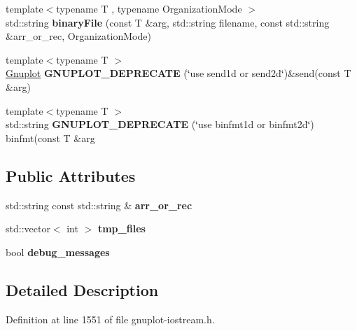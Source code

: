 \begin{DoxyCompactItemize}
\item 
{\footnotesize template$<$typename T , typename Organization\+Mode $>$ }\\std\+::string {\bfseries binary\+File} (const T \&arg, std\+::string filename, const std\+::string \&arr\+\_\+or\+\_\+rec, Organization\+Mode)\hypertarget{classgnuplotio_1_1_gnuplot_ad90501e6dbab5379abcd76fd0e2e4ef1}{}\label{classgnuplotio_1_1_gnuplot_ad90501e6dbab5379abcd76fd0e2e4ef1}

\item 
{\footnotesize template$<$typename T $>$ }\\\hyperlink{classgnuplotio_1_1_gnuplot}{Gnuplot} {\bfseries G\+N\+U\+P\+L\+O\+T\+\_\+\+D\+E\+P\+R\+E\+C\+A\+TE} (\char`\"{}use send1d or send2d\char`\"{})\&send(const T \&arg)\hypertarget{classgnuplotio_1_1_gnuplot_ab2edc3c8f57483c6d9db86d685f3eee7}{}\label{classgnuplotio_1_1_gnuplot_ab2edc3c8f57483c6d9db86d685f3eee7}

\item 
{\footnotesize template$<$typename T $>$ }\\std\+::string {\bfseries G\+N\+U\+P\+L\+O\+T\+\_\+\+D\+E\+P\+R\+E\+C\+A\+TE} (\char`\"{}use binfmt1d or binfmt2d\char`\"{}) binfmt(const T \&arg\hypertarget{classgnuplotio_1_1_gnuplot_aeb3ba94ed04ecd46b55f89591ba23e7c}{}\label{classgnuplotio_1_1_gnuplot_aeb3ba94ed04ecd46b55f89591ba23e7c}

\end{DoxyCompactItemize}
\subsection*{Public Attributes}
\begin{DoxyCompactItemize}
\item 
std\+::string const std\+::string \& {\bfseries arr\+\_\+or\+\_\+rec}\hypertarget{classgnuplotio_1_1_gnuplot_a2d194dbd4d2f3475ff6f9b8384e62a9f}{}\label{classgnuplotio_1_1_gnuplot_a2d194dbd4d2f3475ff6f9b8384e62a9f}

\item 
std\+::vector$<$ int $>$ {\bfseries tmp\+\_\+files}\hypertarget{classgnuplotio_1_1_gnuplot_a92a4f6322e486de17db4507a5fc77348}{}\label{classgnuplotio_1_1_gnuplot_a92a4f6322e486de17db4507a5fc77348}

\item 
bool {\bfseries debug\+\_\+messages}\hypertarget{classgnuplotio_1_1_gnuplot_a63e08bfd0cd02937d895ecfb6180107c}{}\label{classgnuplotio_1_1_gnuplot_a63e08bfd0cd02937d895ecfb6180107c}

\end{DoxyCompactItemize}


\subsection{Detailed Description}


Definition at line 1551 of file gnuplot-\/iostream.\+h.

